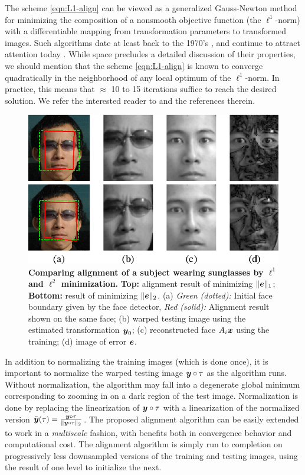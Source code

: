 \documentclass[10pt,journal,letterpaper,compsoc]{IEEEtran}
\begin{document}
The scheme \eqref{eqn:L1-align} can be viewed as a generalized Gauss-Newton method for minimizing the composition of a nonsmooth objective function (the $\ell^1$-norm) with a differentiable mapping from transformation parameters to transformed images. Such algorithms date at least back to the 1970's  \cite{Cromme1978-NM,Jittorntrum1980-NM}, and continue to attract attention today \cite{Lewis2008-TR}. While space precludes a detailed discussion of their properties, we should mention that the scheme \eqref{eqn:L1-align} is known to converge quadratically in the neighborhood of any local optimum of the $\ell^1$-norm. In practice, this means that $\approx$ 10 to 15 iterations suffice to reach the desired solution. We refer the interested reader to \cite{Jittorntrum1980-NM,Osborne1990-JAMSSB} and the references therein.

\begin{figure}
\centering
\includegraphics{Figure_2}
\caption{{\bf Comparing alignment of a subject wearing sunglasses by
$\ell^1$ and $\ell^2$ minimization.}
{\bf Top:} alignment result of minimizing $\|\boldsymbol{e}\|_1$; {\bf Bottom:}
result of minimizing $\|\boldsymbol{e}\|_2$. (a) {\em Green (dotted):} Initial face boundary
given by the face detector, {\em Red (solid):} Alignment result shown on the same
face; (b) warped testing image using the estimated transformation ${\boldsymbol{y}}_0$;
(c) reconstructed face $A_i{\boldsymbol{x}}$ using the training; (d) image of error $\boldsymbol{e}$. }\label{fig:L1-L2-align}
\vspace{-5.0mm}
\end{figure}

In addition to normalizing the training images (which is done
once), it is important to normalize the warped testing image
${\boldsymbol{y}} \circ \tau$ as the algorithm runs.  Without normalization,
the algorithm may fall into a degenerate global minimum
corresponding to zooming in on a dark region of the test
image.  Normalization is done by replacing the linearization of
${\boldsymbol{y}} \circ \tau$ with a linearization of the normalized version
$\tilde {{\boldsymbol{y}}}(\tau) = \frac{{\boldsymbol{y}} \circ \tau}{\|{\boldsymbol{y}} \circ \tau\|_2}$.
The proposed alignment algorithm can be easily extended to work
in a {\em multiscale} fashion, with benefits both in
convergence behavior and computational cost.  The alignment
algorithm is simply run to completion on progressively less
downsampled versions of the training and testing images, using
the result of one level to initialize the next.
\end{document}
